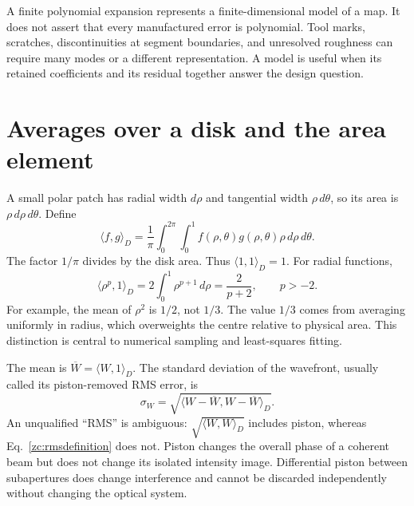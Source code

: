A finite polynomial expansion represents a finite-dimensional model of a
map. It does not assert that every manufactured error is polynomial.
Tool marks, scratches, discontinuities at segment boundaries, and
unresolved roughness can require many modes or a different representation.
A model is useful when its retained coefficients and its residual together
answer the design question.

\section{Averages over a disk and the area element}
A small polar patch has radial width $d\rho$ and tangential width
$\rho\,d\theta$, so its area is $\rho\,d\rho\,d\theta$. Define
\begin{equation}
 \langle f,g\rangle_D=
 \frac1\pi\int_0^{2\pi}\int_0^1
       f(\rho,\theta)g(\rho,\theta)\rho\,d\rho\,d\theta.
 \label{zc:innerproduct}
\end{equation}
The factor $1/\pi$ divides by the disk area. Thus $\langle1,1\rangle_D=1$.
For radial functions,
\begin{equation}
 \langle\rho^p,1\rangle_D=2\int_0^1\rho^{p+1}\,d\rho
                 =\frac{2}{p+2},\qquad p>-2.
 \label{zc:radialmoment}
\end{equation}
For example, the mean of $\rho^2$ is $1/2$, not $1/3$. The value $1/3$
comes from averaging uniformly in radius, which overweights the centre
relative to physical area. This distinction is central to numerical
sampling and least-squares fitting.

The mean is $\overline W=\langle W,1\rangle_D$. The standard deviation
of the wavefront, usually called its piston-removed RMS error, is
\begin{equation}
 \sigma_W=\sqrt{\langle W-\overline W,W-\overline W\rangle_D}.
 \label{zc:rmsdefinition}
\end{equation}
An unqualified ``RMS'' is ambiguous: $\sqrt{\langle W,W\rangle_D}$
includes piston, whereas Eq.~\eqref{zc:rmsdefinition} does not.
Piston changes the overall phase of a coherent beam but does not change
its isolated intensity image. Differential piston between subapertures
does change interference and cannot be discarded independently without
changing the optical system.

